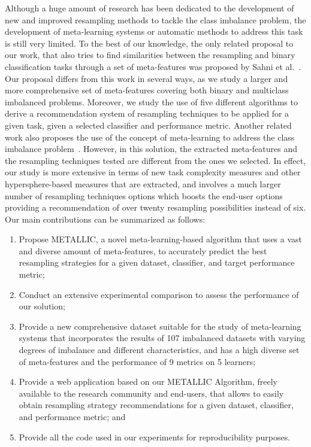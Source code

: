 \documentclass{article}
\begin{document}
Although a huge amount of research has been dedicated to the development of new and improved resampling methods to tackle the class imbalance problem, the development of meta-learning systems or automatic methods to address this task is still very limited. To the best of our knowledge, the only related proposal to our work, that also tries to find similarities between the resampling and binary classification tasks through a set of meta-features was proposed by Sahni et al.~\cite{sahniAidedSelectionSampling2021}. Our proposal differs from this work in several ways, as we study a larger and more comprehensive set of meta-features covering both binary and multiclass imbalanced problems. Moreover, we study the use of five different algorithms to derive a recommendation system of resampling techniques to be applied for a given task, given a selected classifier and performance metric. Another related work also proposes the use of the concept of meta-learning to address the class imbalance problem~\cite{monizAutomatedImbalancedClassification2021}. However, in this solution, the extracted meta-features and the resampling techniques tested are different from the ones we selected. In effect, our study is more extensive in terms of new task complexity measures and other hypersphere-based measures that are extracted, and involves a much larger number of resampling techniques options which boosts the end-user options providing a recommendation of over twenty resampling possibilities instead of six. Our main contributions can be summarized as follows:


\begin{enumerate}[label=(\roman*)]
\item Propose METALLIC, a novel meta-learning-based algorithm that uses a vast and diverse amount of meta-features, to accurately predict the best resampling strategies for a given dataset, classifier, and target performance metric; 
\item Conduct an extensive experimental comparison to assess the performance of our solution;
\item Provide a new comprehensive dataset suitable for the study of meta-learning systems that incorporates the results of 107 imbalanced datasets with varying degrees of imbalance and different characteristics, and has a high diverse set of meta-features and the performance of 9 metrics on 5 learners;
\item Provide a web application based on our METALLIC Algorithm,
freely available to the research community and end-users, that allows to easily obtain resampling strategy recommendations for a given dataset, classifier, and performance metric; and
\item Provide all the code used in our experiments for reproducibility purposes.
\end{enumerate}
\end{document}
